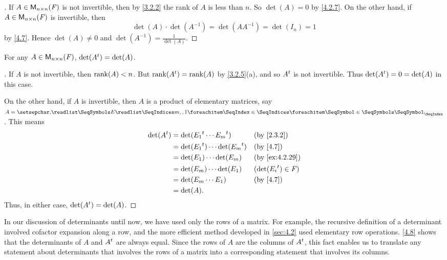 \begin{proof}[]
	If \(A \in \ms[n][n][\F]\) is not invertible, then by \cref{3.2.2} the rank of \(A\) is less than \(n\).
	So \(\det(A) = 0\) by \cref{4.2.7}.
	On the other hand, if \(A \in \ms[n][n][\F]\) is invertible, then
	\[
		\det(A) \cdot \det(A^{-1}) = \det(A A^{-1}) = \det(I_n) = 1
	\]
	by \cref{4.7}.
	Hence \(\det(A) \neq 0\) and \(\det(A^{-1}) = \frac{1}{\det(A)}\).
\end{proof}

\begin{thm}\label{4.8}
	For any \(A \in \ms[n][n][\F]\), \(\det({A}^{t}) = \det(A)\).
\end{thm}

\begin{proof}[]
	If \(A\) is not invertible, then \(\rk{A} < n\).
	But \(\rk{\tp{A}} = \rk{A}\) by \cref{3.2.5}(a), and so \({A}^{t}\) is not invertible.
	Thus \(\det({A}^{t}) = 0 = \det(A)\) in this case.

	On the other hand, if \(A\) is invertible, then \(A\) is a product of elementary matrices, say \(A = \seq[]{E}{m,,1}\).
	This means
	\begin{align*}
		\det(\tp{A}) & = \det(\tp{E_1} \cdots \tp{E_m})       &  & \by{2.3.2}              \\
		             & = \det(\tp{E_1}) \cdots \det(\tp{E_m}) &  & \by{4.7}                \\
		             & = \det(E_1) \cdots \det(E_m)           &  & \by{ex:4.2.29}          \\
		             & = \det(E_m) \cdots \det(E_1)           &  & (\det(\tp{E_i}) \in \F) \\
		             & = \det(E_m \cdots E_1)                 &  & \by{4.7}                \\
		             & = \det(A).
	\end{align*}
	Thus, in either case, \(\det({A}^{t}) = \det(A)\).
\end{proof}

\begin{note}
	In our discussion of determinants until now, we have used only the rows of a matrix.
	For example, the recursive definition of a determinant involved cofactor expansion along a row, and the more efficient method developed in \cref{sec:4.2} used elementary row operations.
	\cref{4.8} shows that the determinants of \(A\) and \({A}^{t}\) are always equal.
	Since the rows of \(A\) are the columns of \({A}^{t}\), this fact enables us to translate any statement about determinants that involves the rows of a matrix into a corresponding statement that involves its columns.
\end{note}

